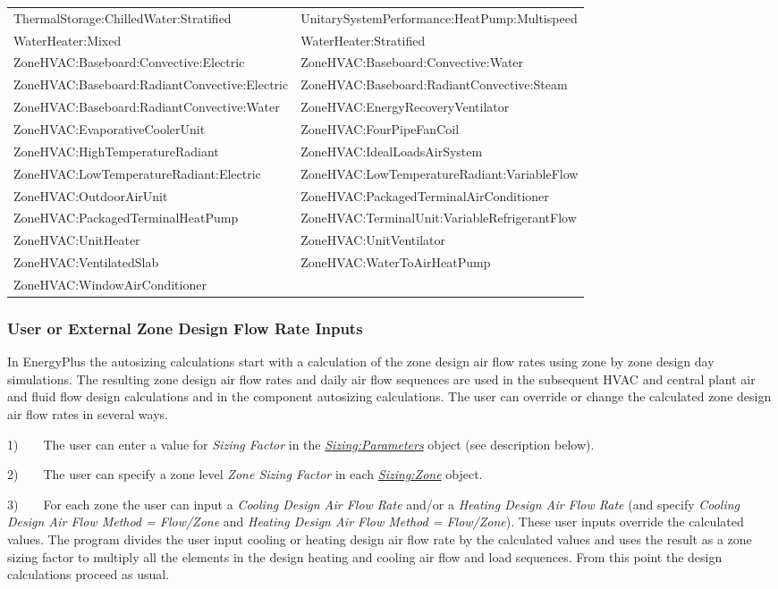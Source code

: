\begin{longtable}[c]{p{3.3in}p{3.3in}}
ThermalStorage:ChilledWater:Stratified & UnitarySystemPerformance:HeatPump:Multispeed \tabularnewline
WaterHeater:Mixed & WaterHeater:Stratified \tabularnewline
ZoneHVAC:Baseboard:Convective:Electric & ZoneHVAC:Baseboard:Convective:Water \tabularnewline
ZoneHVAC:Baseboard:RadiantConvective:Electric & ZoneHVAC:Baseboard:RadiantConvective:Steam \tabularnewline
ZoneHVAC:Baseboard:RadiantConvective:Water & ZoneHVAC:EnergyRecoveryVentilator \tabularnewline
ZoneHVAC:EvaporativeCoolerUnit & ZoneHVAC:FourPipeFanCoil \tabularnewline
ZoneHVAC:HighTemperatureRadiant & ZoneHVAC:IdealLoadsAirSystem \tabularnewline
ZoneHVAC:LowTemperatureRadiant:Electric & ZoneHVAC:LowTemperatureRadiant:VariableFlow \tabularnewline
ZoneHVAC:OutdoorAirUnit & ZoneHVAC:PackagedTerminalAirConditioner \tabularnewline
ZoneHVAC:PackagedTerminalHeatPump & ZoneHVAC:TerminalUnit:VariableRefrigerantFlow \tabularnewline
ZoneHVAC:UnitHeater & ZoneHVAC:UnitVentilator \tabularnewline
ZoneHVAC:VentilatedSlab & ZoneHVAC:WaterToAirHeatPump \tabularnewline
ZoneHVAC:WindowAirConditioner &  \tabularnewline
\bottomrule
\end{longtable}

\subsubsection{User or External Zone Design Flow Rate Inputs}\label{user-or-external-zone-design-flow-rate-inputs}

In EnergyPlus the autosizing calculations start with a calculation of the zone design air flow rates using zone by zone design day simulations. The resulting zone design air flow rates and daily air flow sequences are used in the subsequent HVAC and central plant air and fluid flow design calculations and in the component autosizing calculations. The user can override or change the calculated zone design air flow rates in several ways.

1)~~~~The user can enter a value for \emph{Sizing Factor} in the \emph{\hyperref[sizingparameters]{Sizing:Parameters}} object (see description below).

2)~~~~The user can specify a zone level \emph{Zone Sizing Factor} in each \emph{\hyperref[sizingzone]{Sizing:Zone}} object.

3)~~~~For each zone the user can input a \emph{Cooling Design Air Flow Rate} and/or a \emph{Heating Design Air Flow Rate} (and specify \emph{Cooling Design Air Flow Method = Flow/Zone} and \emph{Heating Design Air Flow Method = Flow/Zone}). These user inputs override the calculated values. The program divides the user input cooling or heating design air flow rate by the calculated values and uses the result as a zone sizing factor to multiply all the elements in the design heating and cooling air flow and load sequences. From this point the design calculations proceed as usual.

